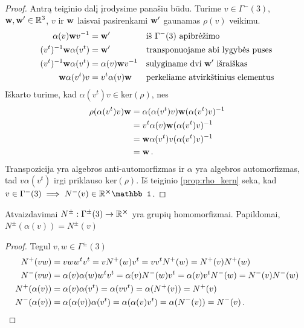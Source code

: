 \begin{proof}
	Antrą teiginio dalį įrodysime panašiu būdu.
	Turime $v \in \Gamma^-(3)$, $\vb w, \vb w' \in \mathbb{R}^3$,
	$v$ ir $\vb w$ laisvai pasirenkami $\vb w'$ gaunamas $\rho(v)$ veikimu.
	\begin{equation}
		\begin{aligned}
			\alpha(v)\vb w v^{-1} &= \vb w'
			&&\text{iš $\Gamma^-(3)$ apibrėžimo}
			\\
			(v^t)^{-1}  \vb w  \alpha(v^t) &= \vb w'
			&&\text{transponuojame abi lygybės puses}
			\\
			(v^t)^{-1}  \vb w  \alpha(v^t) &= \alpha(v)\vb w v^{-1}
			&&\text{sulyginame dvi $\vb w'$ išraiškas}
			\\
			\vb w  \alpha(v^t) v &= v^t \alpha(v)\vb w 
			&&\text{perkeliame atvirkštinius elementus}
		\end{aligned}
	\end{equation}
	Iškarto turime, kad $\alpha(v^t) v \in \mathup{ker}(\rho)$, nes
	\begin{equation}
		\begin{aligned}
			\rho(\alpha(v^t) v)\vb w 
			&= \alpha(\alpha(v^t) v)\vb w (\alpha(v^t) v)^{-1}
			\\&= v^t \alpha(v) \vb w (\alpha(v^t) v)^{-1}
			\\&= \vb w  \alpha(v^t) v (\alpha(v^t) v)^{-1}
			\\&= \vb w 
			\,.
		\end{aligned}
	\end{equation}
	Transpozicija yra algebros anti-automorfizmas
	ir $\alpha$ yra algebros automorfizmas,
	tad $v \alpha(v^t)$ irgi priklauso $\mathup{ker}(\rho)$.
	Iš teiginio \ref{prop:rho_kern} seka,
	kad $v \in \Gamma^-(3) \implies N^-(v) \in \set R^{\cross} \mathbb1$.
\end{proof}

\begin{proposition}
	Atvaizdavimai $N^\pm: \Gamma^\pm(3) \to \mathbb{R}^{\cross}$
	yra grupių homomorfizmai.
	Papildomai, $N^\pm(\alpha(v)) = N^\pm(v)$
\end{proposition}
\begin{proof}
	Tegul $v,w \in \Gamma^\pm(3)$
	\begin{equation}
		\begin{aligned}
			N^+(vw) &= v w w^t v^t = v N^+(w) v^t = v v^t N^+(w) = N^+(v) N^+(w)
			\\
			N^-(vw) &= \alpha(v) \alpha(w) w^t v^t = \alpha(v) N^-(w) v^t = \alpha(v) v^t N^-(w)  = N^-(v) N^-(w)
			\\
			N^+(\alpha(v)) &= \alpha(v) \alpha(v^t) = \alpha(v v^t) = \alpha(N^+(v)) = N^+(v)
			\\
			N^-(\alpha(v)) &= \alpha(\alpha(v)) \alpha(v^t) = \alpha(\alpha(v) v^t) = \alpha(N^-(v)) = N^-(v)
			\,. \qedhere
		\end{aligned}
	\end{equation}
\end{proof}

